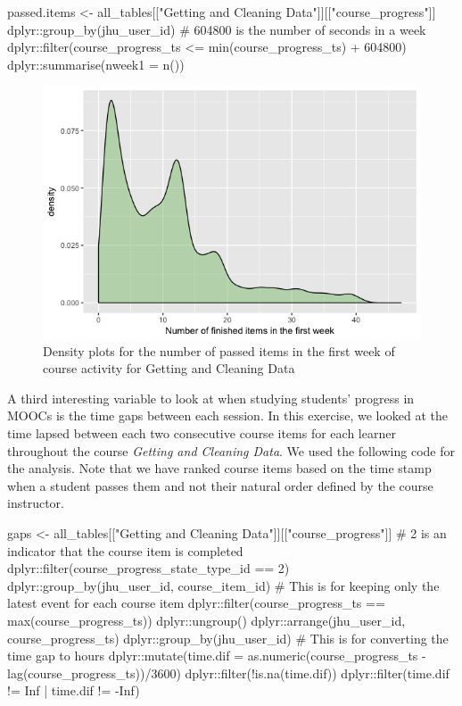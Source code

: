 \begin{Schunk}
\begin{Sinput}
passed.items <- all_tables[["Getting and Cleaning Data"]][["course_progress"]] %
    dplyr::group_by(jhu_user_id) %
    # 604800 is the number of seconds in a week
    dplyr::filter(course_progress_ts <= min(course_progress_ts) + 604800) %
    dplyr::summarise(nweek1 = n())
\end{Sinput}
\end{Schunk}

\begin{figure}[htbp]
    \centering
    \includegraphics[scale=0.5]{passeditems}
    \caption{Density plots for the number of passed items in the first week of course activity for Getting and Cleaning Data}
    \label{figure:passeditems}
\end{figure}

A third interesting variable to look at when studying students' progress
in MOOCs is the time gaps between each session. In this exercise, we
looked at the time lapsed between each two consecutive course items for
each learner throughout the course \emph{Getting and Cleaning Data}. We
used the following code for the analysis. Note that we have ranked
course items based on the time stamp when a student passes them and not
their natural order defined by the course instructor.

\begin{Schunk}
\begin{Sinput}
gaps <- all_tables[["Getting and Cleaning Data"]][["course_progress"]] %
    # 2 is an indicator that the course item is completed
    dplyr::filter(course_progress_state_type_id == 2) %
    dplyr::group_by(jhu_user_id, course_item_id) %
    # This is for keeping only the latest event for each course item
    dplyr::filter(course_progress_ts == max(course_progress_ts)) %
    dplyr::ungroup() %
    dplyr::arrange(jhu_user_id, course_progress_ts) %
    dplyr::group_by(jhu_user_id) %
    # This is for converting the time gap to hours
    dplyr::mutate(time.dif = as.numeric(course_progress_ts - 
                                            lag(course_progress_ts))/3600) %
    dplyr::filter(!is.na(time.dif)) %
    dplyr::filter(time.dif != Inf | time.dif != -Inf)
\end{Sinput}
\end{Schunk}

